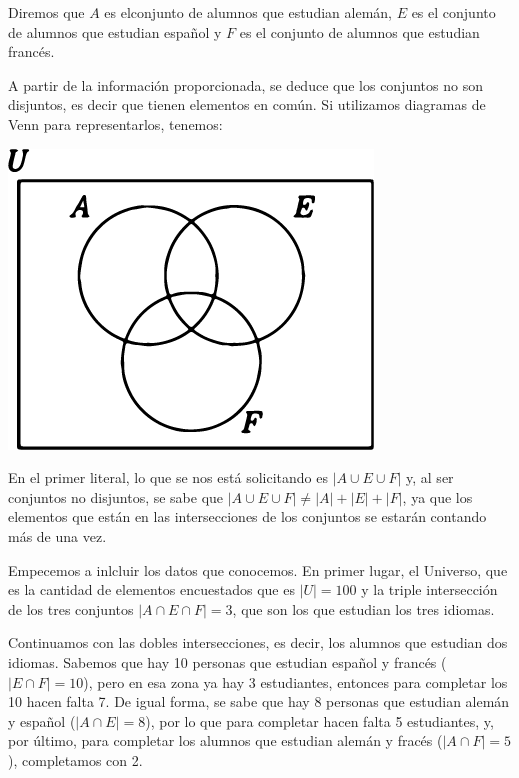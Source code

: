 \documentclass[12pt]{article}
\begin{document}
\begin{solucion}
    Diremos que $A$ es elconjunto de alumnos que estudian alemán, $E$ es el conjunto de alumnos que estudian español y $F$ es el conjunto de alumnos que estudian francés.

    A partir de la información proporcionada, se deduce que los conjuntos  no  son  disjuntos,  es  decir  que  tienen  elementos  en  común. Si utilizamos diagramas de Venn para representarlos, tenemos:

    \begin{center}
        \includegraphics[scale=0.5]{Imagenes/IMG7/Venn1.png}
    \end{center}

    En el primer literal, lo que se nos está solicitando es $| A \cup E \cup F |$ y, al ser conjuntos no disjuntos, se sabe que $ |A \cup E \cup F | \neq |A| + |E| + |F|$, ya que  los  elementos  que  están  en  las  intersecciones  de  los  conjuntos se estarán contando más de una vez.

    Empecemos  a  inlcluir  los  datos  que  conocemos.  En  primer  lugar, el  Universo,  que  es  la  cantidad  de  elementos  encuestados  que  es $|U|=100$ y la triple intersección de los tres conjuntos $ |A \cap E \cap F|=3$, que son los que estudian los tres idiomas.

    Continuamos con las dobles intersecciones, es decir, los alumnos que estudian dos idiomas. Sabemos que hay 10 personas que estudian español y francés ($|E \cap F| =10$), pero en esa zona ya hay 3 estudiantes, entonces para completar los 10 hacen falta 7. De igual forma, se sabe que hay 8 personas que estudian alemán y español ($|A \cap E| =8$), por lo que para completar hacen falta 5 estudiantes, y, por último, para completar los alumnos que estudian alemán y fracés ($|A \cap F| =5$), completamos con 2.


\end{solucion}
\end{document}
